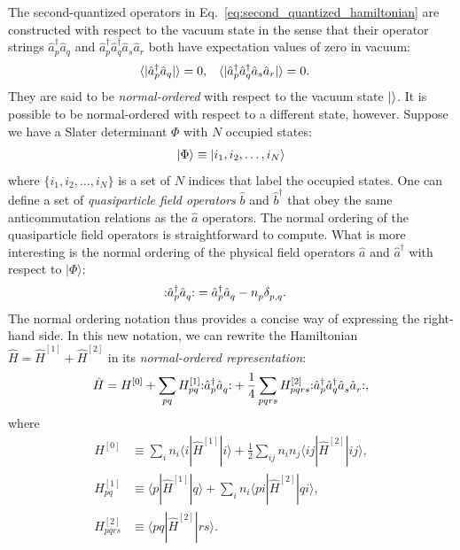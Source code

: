 The second-quantized operators in
Eq.~\eqref{eq:second_quantized_hamiltonian} are constructed with
respect to the vacuum state in the sense that their operator strings
$\hat{a}_p^\dagger \hat{a}_q$ and
$\hat{a}_p^\dagger \hat{a}_q^\dagger \hat{a}_s \hat{a}_r$ both have
expectation values of zero in vacuum:
\begin{align*}
&\langle  | \hat{a}_p^\dagger \hat{a}_q |  \rangle = 0, &
&\langle  | \hat{a}_p^\dagger \hat{a}_q^\dagger \hat{a}_s \hat{a}_r |  \rangle = 0.
\end{align*}
They are said to be \emph{normal-ordered} with respect to the vacuum state $|  \rangle$.  It is possible to be normal-ordered with respect to a different state, however.  Suppose we have a Slater determinant $\Phi$ with $N$ occupied states:
\begin{align*}
  | \Phi \rangle \equiv | i_1, i_2, \ldots, i_N \rangle
\end{align*}
where $\{i_1, i_2, \ldots, i_N\}$ is a set of $N$ indices that label
the occupied states.  One can define a set of \textit{quasiparticle
field operators} $\hat b$ and $\hat b^\dagger$ that obey the same
anticommutation relations as the $\hat a$ operators.  The normal
ordering of the quasiparticle field operators is straightforward to
compute.  What is more interesting is the normal ordering of the
physical field operators $\hat a$ and $\hat a^\dagger$ with respect to
$|\Phi\rangle$:
\begin{align*}
  \mathopen: \hat{a}_p^\dagger \hat{a}_q^{} \mathclose: &=
  \hat{a}_p^\dagger \hat{a}_q^{} - n_p^{} \delta_{p, q}^{}.
\end{align*}
The normal ordering notation thus provides a concise way of expressing the right-hand side.  In this new notation, we can rewrite the Hamiltonian $\hat H = \hat{H}^{[1]} + \hat{H}^{[2]}$ in its \emph{normal-ordered representation}:
\begin{align}
  \hat{H} = H^{[0]} + \sum_{pq} H^{[1]}_{pq} \mathopen: \hat{a}_p^\dagger \hat{a}_q^{} \mathclose: + \frac{1}{4} \sum_{pqrs} H^{[2]}_{pqrs} \mathopen: \hat{a}_p^\dagger \hat{a}_q^\dagger \hat{a}_s^{} \hat{a}_r^{} \mathclose:,
  \label{eq:normordhamiltonian}
\end{align}
where
\begin{align*}
  H^{[0]} &\equiv \sum_{i} n_i \langle i | \hat{H}^{[1]} | i \rangle + \frac{1}{2} \sum_{ij} n_i n_j \langle ij | \hat{H}^{[2]} | ij \rangle, \\
  H^{[1]}_{pq} &\equiv \langle p | \hat{H}^{[1]} | q \rangle + \sum_{i} n_i \langle pi | \hat{H}^{[2]} | qi \rangle, \\
  H^{[2]}_{pqrs} &\equiv \langle pq | \hat{H}^{[2]} | rs \rangle. \\
\end{align*}
